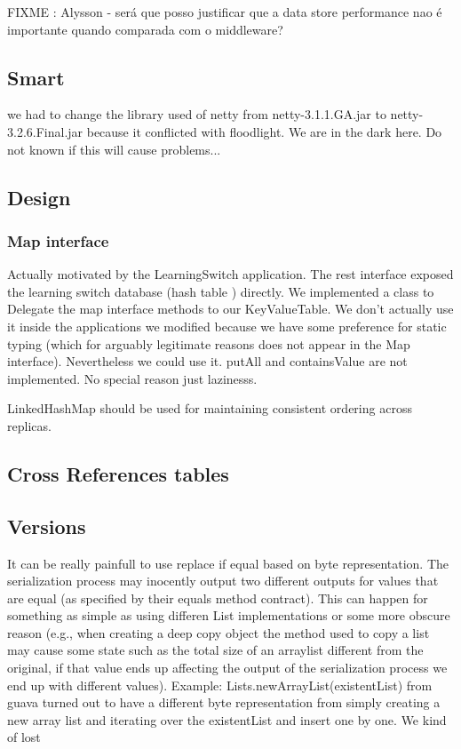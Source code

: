 FIXME : Alysson - será que posso justificar que a data store
performance nao é importante quando comparada com o middleware? 

\subsection{Smart}
we had to change the library used of netty from netty-3.1.1.GA.jar to
netty-3.2.6.Final.jar because it conflicted with floodlight. We are in
the dark here. Do not known if this will cause problems... 

\subsection{Design}

\subsubsection{Map interface} 
Actually motivated by the LearningSwitch application. The rest interface exposed the learning switch database (hash table ) directly. We implemented a class to Delegate the map interface methods to our KeyValueTable. We don't actually use it inside the applications we modified because we have some preference for static typing (which for arguably legitimate reasons does not appear in the Map interface). Nevertheless we could use it. putAll and containsValue are not implemented. No special reason just lazinesss.  

LinkedHashMap should be used for maintaining consistent ordering
across replicas. 

\subsection{Cross References tables}
\label{sec.datastore.cross.references}
\subsection{Versions}
It can be really painfull to use replace if equal based on byte
representation. The serialization process may inocently output two
different outputs for values that are equal (as specified by their
equals method contract).  This can happen for something as simple as
using differen List implementations or some more obscure reason (e.g.,
when creating a deep copy object the method used to copy a list may
cause some state such as the total size of an arraylist different from
the original, if that value ends up affecting the output of the
serialization process we end up with different values). 
Example: Lists.newArrayList(existentList) from guava turned out to
have a different byte representation from  simply creating a new array
list and iterating over the existentList and insert one by one. We
kind of lost 

